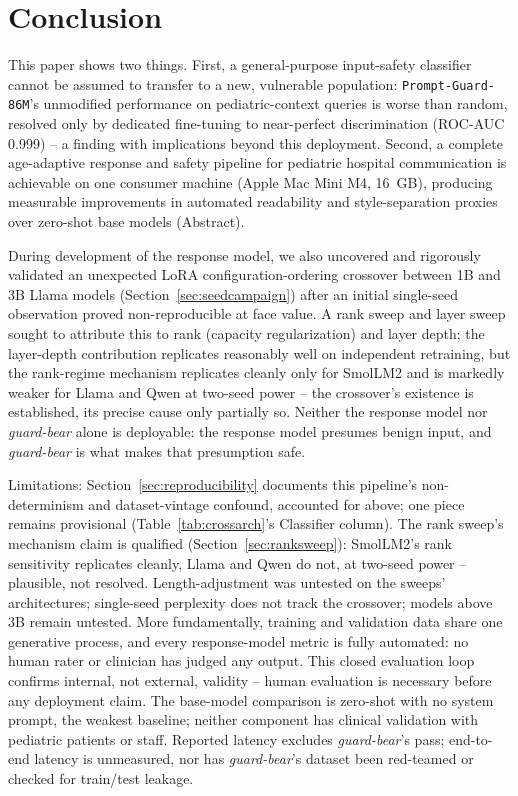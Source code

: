 \documentclass[pdflatex,sn-mathphys-num]{sn-jnl}%
\begin{document}
\section{Conclusion}\label{sec:conclusion}

This paper shows two things. First, a general-purpose input-safety classifier cannot be assumed to transfer to a new, vulnerable population: \texttt{Prompt-Guard-86M}'s unmodified performance on pediatric-context queries is worse than random, resolved only by dedicated fine-tuning to near-perfect discrimination (ROC-AUC 0.999) -- a finding with implications beyond this deployment. Second, a complete age-adaptive response and safety pipeline for pediatric hospital communication is achievable on one consumer machine (Apple Mac Mini M4, 16~GB), producing measurable improvements in automated readability and style-separation proxies over zero-shot base models (Abstract).

During development of the response model, we also uncovered and rigorously validated an unexpected LoRA configuration-ordering crossover between 1B and 3B Llama models (Section~\ref{sec:seedcampaign}) after an initial single-seed observation proved non-reproducible at face value. A rank sweep and layer sweep sought to attribute this to rank (capacity regularization) and layer depth; the layer-depth contribution replicates reasonably well on independent retraining, but the rank-regime mechanism replicates cleanly only for SmolLM2 and is markedly weaker for Llama and Qwen at two-seed power -- the crossover's existence is established, its precise cause only partially so. Neither the response model nor \textit{guard-bear} alone is deployable: the response model presumes benign input, and \textit{guard-bear} is what makes that presumption safe.

Limitations: Section~\ref{sec:reproducibility} documents this pipeline's non-determinism and dataset-vintage confound, accounted for above; one piece remains provisional (Table~\ref{tab:crossarch}'s Classifier column). The rank sweep's mechanism claim is qualified (Section~\ref{sec:ranksweep}): SmolLM2's rank sensitivity replicates cleanly, Llama and Qwen do not, at two-seed power -- plausible, not resolved. Length-adjustment was untested on the sweeps' architectures; single-seed perplexity does not track the crossover; models above 3B remain untested. More fundamentally, training and validation data share one generative process, and every response-model metric is fully automated: no human rater or clinician has judged any output. This closed evaluation loop confirms internal, not external, validity -- human evaluation is necessary before any deployment claim. The base-model comparison is zero-shot with no system prompt, the weakest baseline; neither component has clinical validation with pediatric patients or staff. Reported latency excludes \textit{guard-bear}'s pass; end-to-end latency is unmeasured, nor has \textit{guard-bear}'s dataset been red-teamed or checked for train/test leakage.
\end{document}
